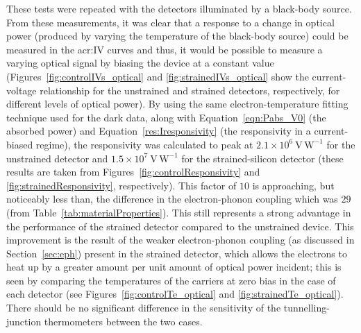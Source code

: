 \par 
These tests were repeated with the detectors illuminated by a black-body source. From these measurements, it was clear that a response to a change in optical power (produced by varying the temperature of the black-body source) could be measured in the \gls{acr:IV} curves and thus, it would be possible to measure a varying optical signal by biasing the device at a constant value (Figures~\ref{fig:controlIVs_optical} and \ref{fig:strainedIVs_optical} show the current-voltage relationship for the unstrained and strained detectors, respectively, for different levels of optical power). By using the same electron-temperature fitting technique used for the dark data, along with Equation~\ref{eqn:Pabs_V0} (the absorbed power) and Equation~\ref{res:Iresponsivity} (the responsivity in a current-biased regime), the responsivity was calculated to peak at $2.1 \times 10^{6}~\mathrm{V\,W^{-1}}$ for the unstrained detector and $1.5 \times 10^{7}~\mathrm{V\,W^{-1}}$ for the strained-silicon detector (these results are taken from Figures~\ref{fig:controlResponsivity} and \ref{fig:strainedResponsivity}, respectively). This factor of $10$ is approaching, but noticeably less than, the difference in the electron-phonon coupling which was $29$ (from Table~\ref{tab:materialProperties}). This still represents a strong advantage in the performance of the strained detector compared to the unstrained device. This improvement is the result of the weaker electron-phonon coupling (as discussed in Section~\ref{sec:eph}) present in the strained detector, which allows the electrons to heat up by a greater amount per unit amount of optical power incident; this is seen by comparing the temperatures of the carriers at zero bias in the case of each detector (see Figures~\ref{fig:controlTe_optical} and \ref{fig:strainedTe_optical}). There should be no significant difference in the sensitivity of the tunnelling-junction thermometers between the two cases.
\par 
